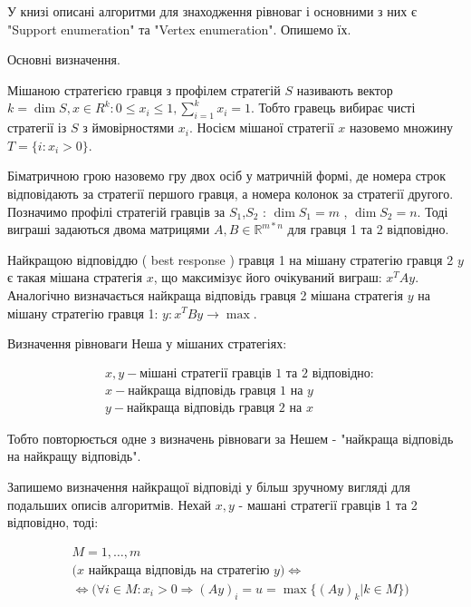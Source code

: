 У книзі \cite{AlgoGameTheory} описані алгоритми для знаходження рівноваг і основними з них є "Support enumeration" та "Vertex enumeration". Опишемо їх.

Основні визначення.

Мішаною стратегією гравця з профілем стратегій $S$ називають вектор $k = \dim S, x \in R^{k} : 0 \le x_i \le 1, \sum_{i=1}^{k} x_i = 1$. Тобто гравець вибирає чисті стратегії із $S$ з ймовірностями $x_i$. Носієм мішаної стратегії $x$ назовемо множину $T=\{ i: x_i > 0\}$.

Біматричною грою назовемо гру двох осіб у матричній формі, де номера строк відповідають за стратегії першого гравця, а номера колонок за стратегії другого. Позначимо профілі стратегій гравців за $S_1$,$S_2$ : $\dim {S_1} = m$ , $\dim {S_2} = n$. Тоді виграші задаються двома матрицями $A,B \in \mathbb{R}^{m*n}$ для гравця 1 та 2 відповідно.

Найкращою відповіддю ( best response ) гравця 1 на мішану стратегію гравця 2 $y$ є такая мішана стратегія $x$, що максимізує його очікуваний виграш: $x^TAy$. Аналогічно визначається найкраща відповідь гравця 2 мішана стратегія $y$ на мішану стратегію гравця 1: $y: x^TBy \rightarrow \max$.

Визначення рівноваги Неша у мішаних стратегіях:

\begin{equation}
	\begin{aligned}
		& x,y - \textrm{мішані стратегії гравців 1 та 2 відповідно}: \\
		& x - \textrm{найкраща відповідь гравця 1 на } y \\
		& y - \textrm{найкраща відповідь гравця 2 на } x
	\end{aligned}
\end{equation}

Тобто повторюється одне з визначень рівноваги за Нешем - "найкраща відповідь на найкращу відповідь".

Запишемо визначення найкращої відповіді у більш зручному вигляді для подальших описів алгоритмів. Нехай $x,y$ - машані стратегії гравців 1 та 2 відповідно, тоді:

\begin{equation}
	\begin{aligned}
		& M = {1,\ldots,m} \\
		& \bigg( x \textrm{ найкраща відповідь на стратегію } y  \bigg)\Leftrightarrow \\
		& \Leftrightarrow \bigg( \forall i \in M: x_i > 0 \Rightarrow (Ay)_i = u = \max\{(Ay)_k | k \in M\} \bigg)
	\end{aligned}
	\label{eq:best_response}
\end{equation}

